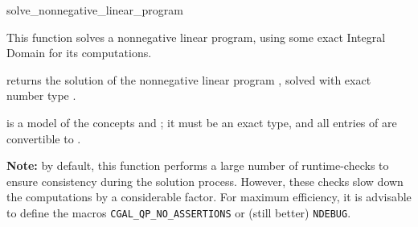 \begin{ccRefFunction}{solve_nonnegative_linear_program}


This function solves a nonnegative linear program, using some exact
Integral Domain  for its computations.   

{returns the solution of the nonnegative linear program , solved
with exact number type .}

 is a model of the concepts  and
; it must
be an exact type, and all entries of  are convertible to 
.

{\bf Note:} by default, this function performs a large number of 
runtime-checks to ensure consistency during the solution process.
However, these checks slow down the computations by a considerable
factor. For maximum efficiency, it is advisable to define the macros
\texttt{CGAL\_QP\_NO\_ASSERTIONS} or (still better) 
\texttt{NDEBUG}.
\end{ccRefFunction}
